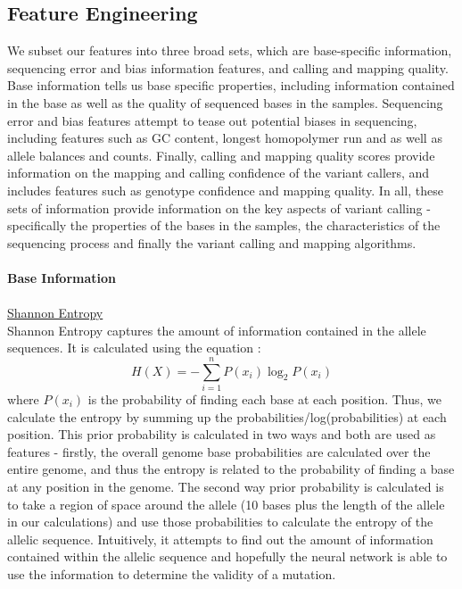 \documentclass{article}
\begin{document}
\subsection{Feature Engineering}
We subset our features into three broad sets, which are base-specific information, sequencing error and bias information features, and calling and mapping quality. Base information tells us base specific properties, including information contained in the base as well as the quality of sequenced bases in the samples. Sequencing error and bias features attempt to tease out potential biases in sequencing, including features such as GC content, longest homopolymer run and as well as allele balances and counts. Finally, calling and mapping quality scores provide information on the mapping and calling confidence of the variant callers, and includes features such as genotype confidence and mapping quality. In all, these sets of information provide information on the key aspects of variant calling - specifically the properties of the bases in the samples, the characteristics of the sequencing process and finally the variant calling and mapping algorithms.\\\\
\textbf{Base Information} \\\\
\underline{Shannon Entropy}\\
Shannon Entropy captures the amount of information contained in the allele sequences. It is calculated using the equation :
\begin{equation}
H(X) = -\sum_{i=1}^{n}P(x_i)\log_{2}P(x_i)
\end{equation}
where $P(x_i)$ is the probability of finding each base at each position. Thus, we calculate the entropy by summing up the probabilities/log(probabilities) at each position. This prior probability is calculated in two ways and both are used as features - firstly, the overall genome base probabilities are calculated over the entire genome, and thus the entropy is related to the probability of finding a base at any position in the genome. The second way prior probability is calculated is to take a region of space around the allele (10 bases plus the length of the allele in our calculations) and use those probabilities to calculate the entropy of the allelic sequence. Intuitively, it attempts to find out the amount of information contained within the allelic sequence and hopefully the neural network is able to use the information to determine the validity of a mutation.\\\\
\end{document}
